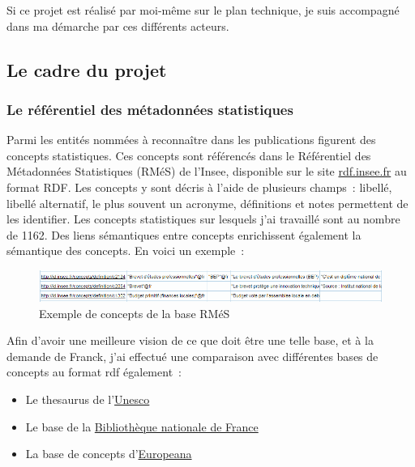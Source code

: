 Si ce projet est réalisé par moi-même sur le plan technique, je suis accompagné dans ma démarche par ces différents acteurs.
\label{section 1.1.2}

\subsection{Le cadre du projet}

\subsubsection{Le référentiel des métadonnées statistiques}
Parmi les entités nommées à reconnaître dans les publications figurent des concepts statistiques. Ces concepts sont référencés dans le Référentiel des Métadonnées Statistiques (RMéS) de l'Insee, disponible sur le site \href{http://rdf.insee.fr/sparql}{rdf.insee.fr} \cite{rdf.insee.fr} au format RDF. Les concepts y sont décris à l'aide de plusieurs champs~: libellé, libellé alternatif, le plus souvent un acronyme, définitions et notes permettent de les identifier. Les concepts statistiques sur lesquels j'ai travaillé sont au nombre de 1162. Des liens sémantiques entre concepts enrichissent également la sémantique des concepts. En voici un exemple~:
\begin{figure}[H]
    \centering
    \includegraphics[scale=0.68]{images/Exemple-RMeS.png}
    \caption{Exemple de concepts de la base RMéS}
    \label{fig:exemple-rmés}
\end{figure}

Afin d'avoir une meilleure vision de ce que doit être une telle base, et à la demande de Franck, j'ai effectué une comparaison avec différentes bases de concepts au format rdf également~: 
\begin{itemize}
    \item Le thesaurus de l'\href{http://vocabularies.unesco.org/browser/thesaurus/en/?clang=fr}{Unesco} \cite{unesco}
    \item Le base de la \href{https://data.bnf.fr/current/sparql.html}{Bibliothèque nationale de France} \cite{bnf}
    \item La base de concepts d'\href{https://pro.europeana.eu/page/linked-open-data}{Europeana} \cite{europeana-rdf}
    \newline
\end{itemize}

